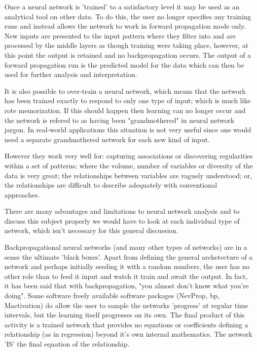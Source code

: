 Once a neural network is 'trained' to a satisfactory level it may be used as an analytical tool on other data. To do this, the user no longer specifies any training runs and instead allows the network to work in forward propagation mode only. New inputs are presented to the input pattern where they filter into and are processed by the middle layers as though training were taking place, however, at this point the output is retained and no backpropagation occurs. The output of a forward propagation run is the predicted model for the data which can then be used for further analysis and interpretation.

It is also possible to over-train a neural network, which means that the network has been trained exactly to respond to only one type of input; which is much like rote memorization. If this should happen then learning can no longer occur and the network is refered to as having been "grandmothered" in neural network jargon. In real-world applications this situation is not very useful since one would need a separate grandmothered network for each new kind of input.

However they work very well for:
capturing associations or discovering regularities within a set of patterns;
where the volume, number of variables or diversity of the data is very great;
the relationships between variables are vaguely understood; or,
the relationships are difficult to describe adequately with conventional approaches.


There are many advantages and limitations to neural network analysis and to discuss this subject properly we would have to look at each individual type of network, which isn't necessary for this general discussion.

Backpropagational neural networks (and many other types of networks) are in a sense the ultimate 'black boxes'. Apart from defining the general archetecture of a network and perhaps initially seeding it with a random numbers, the user has no other role than to feed it input and watch it train and await the output. In fact, it has been said that with backpropagation, "you almost don't know what you're doing". Some software freely available software packages (NevProp, bp, Mactivation) do allow the user to sample the networks 'progress' at regular time intervals, but the learning itself progresses on its own. The final product of this activity is a trained network that provides no equations or coefficients defining a relationship (as in regression) beyond it's own internal mathematics. The network 'IS' the final equation of the relationship.

